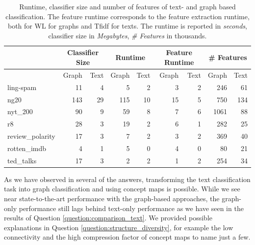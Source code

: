 \begin{table}[htb!]
	\centering
	\begin{tabular}{lrrrrrrrr}
\toprule
		& \multicolumn{2}{c}{Classifier Size} &  \multicolumn{2}{c}{Runtime} &  \multicolumn{2}{c}{Feature Runtime} &  \multicolumn{2}{c}{\# Features} \\
		\midrule
		&  Graph &  Text &  Graph &  Text & Graph &  Text  & Graph &  Text \\
		\midrule
ling-spam       & 11 & 4 & 5 & 2 & 3 & 2 & 246 & 61 \\
ng20            & 143 & 29 & 115 & 10 & 15 & 5 & 750 & 134 \\
nyt\_200         & 90 & 9 & 59 & 8 & 7 & 6 & 1061 & 88 \\
r8              & 28 & 3 & 19 & 2 & 6 & 1 & 282 & 25 \\
review\_polarity & 17 & 3 & 7 & 2 & 3 & 2 & 369 & 40 \\
rotten\_imdb     & 4 & 1 & 5 & 0 & 4 & 0 & 80 & 21 \\
ted\_talks       & 17 & 3 & 2 & 2 & 1 & 2 & 254 & 34 \\
		\bottomrule
	\end{tabular}
\caption[Table: Runtime, classifier size and \# features for graph- and text based classification.]{
	Runtime, classifier size and number of features of text- and graph based classification.
	The feature runtime corresponds to the feature extraction runtime, both for WL for graphs and Tfidf for texts.
	The runtime is reported in \textit{seconds}, classifier size in \textit{Megabytes}, \textit{\# Features} in thousands.
}
\label{table:runtime_and_classifier_size}
\end{table}


As we have observed in several of the answers, transforming the text classification task into graph classification and using concept maps is possible.
While we see near state-to-the-art performance with the graph-based approaches, the graph-only performance still lags behind text-only performance as we have seen in the results of Question \ref{question:comparison_text}.
We provided possible explanations in Question \ref{question:structure_diversity}, for example the low connectivity and the high compression factor of concept maps to name just a few.

